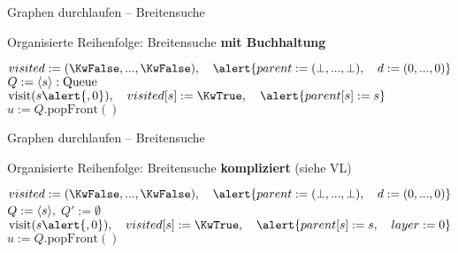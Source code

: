 \begin{frame}{Graphen durchlaufen – Breitensuche}
	\vspace{-1.3\baselineskip}
	\begin{exampleblock}{Organisierte Reihenfolge: Breitensuche \textbf{mit Buchhaltung}}
		\begin{algorithm}[H] 
			 {
				$visited := (\KwFalse, ... , \KwFalse), \quad \alert{parent := (\bot, ..., \bot), \quad d := (0, ..., 0)}$\;
				$Q := \llist{s}: \|Queue|$ \;
				$\|visit|(s\alert{, 0}), \quad visited[s] := \KwTrue, \quad \alert{parent[s] := s}$ \;
				 {
					$u := Q.\text{popFront}()$\;
				} 
			}
		\end{algorithm} 
	\end{exampleblock}
\end{frame}

\begin{frame}{Graphen durchlaufen – Breitensuche}
	\vspace{-.3\baselineskip}
	\begin{exampleblock}{Organisierte Reihenfolge: Breitensuche \textbf{kompliziert} (siehe VL) }
		\begin{algorithm}[H]
			\small \vspace{-.4\baselineskip}
			 {
				$visited := (\KwFalse, ... , \KwFalse), \quad \alert{parent := (\bot, ..., \bot), \quad d := (0, ..., 0)}$\;
				$Q := \langle s \rangle,$ \quad \alert{$Q' := \emptyset$}   \;
				$\|visit|(s\alert{, 0}), \quad visited[s] := \KwTrue, \quad \alert{parent[s] := s, \quad layer := 0}$ \;
				 {
					$u := Q.\text{popFront}()$\;
					\alert{
					} \vspace{-.2\baselineskip}
				} \vspace{-.2\baselineskip}
			}
		\end{algorithm} \vspace{-.5\baselineskip}
	\end{exampleblock}
\end{frame}




